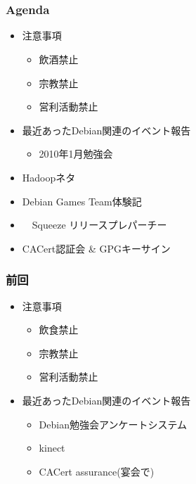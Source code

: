 \frame{\titlepage{}}

\section{}
\begin{frame}
 \frametitle{Agenda}
\begin{minipage}[t]{0.45\hsize}
  \begin{itemize}
  \item 注意事項
	\begin{itemize}
	 \item 飲酒禁止
	 \item 宗教禁止
	 \item 営利活動禁止
	\end{itemize}
  \item 最近あったDebian関連のイベント報告
	\begin{itemize}
	 \item 2010年1月勉強会
	\end{itemize}
 \end{itemize}
\end{minipage} 
\begin{minipage}[t]{0.45\hsize}
 \begin{itemize}
  \item Hadoopネタ
  \item Debian Games Team体験記
  \item　Squeeze リリースプレパーチー
  \item CACert認証会 \& GPGキーサイン
 \end{itemize}
\end{minipage}
\end{frame}

\begin{frame}
 \frametitle{前回}
\begin{minipage}[t]{0.45\hsize}
  \begin{itemize}
  \item 注意事項
	\begin{itemize}
	 \item 飲食禁止
	 \item 宗教禁止
	 \item 営利活動禁止
	\end{itemize}
  \end{itemize}
\end{minipage}
\begin{minipage}[t]{0.45\hsize}
\begin{itemize}
  \item 最近あったDebian関連のイベント報告
	\begin{itemize}
	 \item Debian勉強会アンケートシステム
	 \item kinect
	 \item CACert assurance(宴会で)
	\end{itemize}
 \end{itemize}
\end{minipage}
\end{frame}


